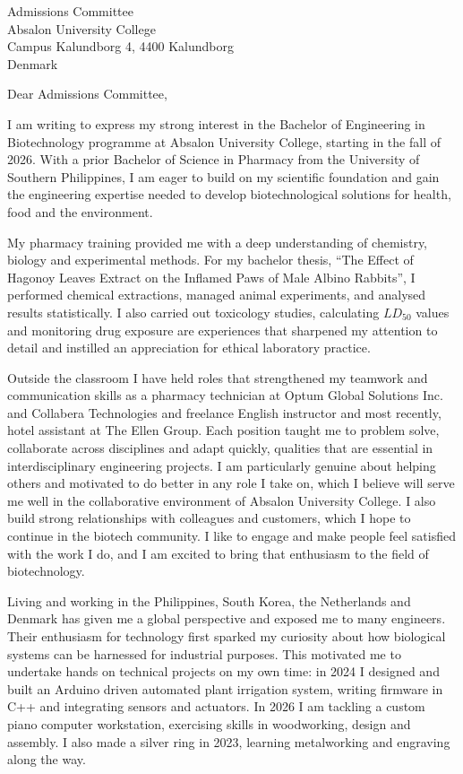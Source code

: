 \documentclass[11pt,a4paper]{letter}
\date{March 7, 2026}
\begin{document}
\begin{letter}{Admissions Committee \\ Absalon University College \\ Campus Kalundborg 4, 4400 Kalundborg\\ Denmark}

\opening{Dear Admissions Committee,}

I am writing to express my strong interest in the Bachelor of Engineering in Biotechnology programme at Absalon University College, starting in the fall of 2026. With a prior Bachelor of Science in Pharmacy from the University of Southern Philippines, I am eager to build on my scientific foundation and gain the engineering expertise needed to develop biotechnological solutions for health, food and the environment.

My pharmacy training provided me with a deep understanding of chemistry, biology and experimental methods. For my bachelor thesis, \enquote{The Effect of Hagonoy Leaves Extract on the Inflamed Paws of Male Albino Rabbits}, I performed chemical extractions, managed animal experiments, and analysed results statistically. I also carried out toxicology studies, calculating $LD_{50}$ values and monitoring drug exposure are experiences that sharpened my attention to detail and instilled an appreciation for ethical laboratory practice.

Outside the classroom I have held roles that strengthened my teamwork and communication skills as a pharmacy technician at Optum Global Solutions Inc. and Collabera Technologies and freelance English instructor and most recently, hotel assistant at The Ellen Group. Each position taught me to problem solve, collaborate across disciplines and adapt quickly, qualities that are essential in interdisciplinary engineering projects. I am particularly genuine about helping others and motivated to do better in any role I take on, which I believe will serve me well in the collaborative environment of Absalon University College. I also build strong relationships with colleagues and customers, which I hope to continue in the biotech community. I like to engage and make people feel satisfied with the work I do, and I am excited to bring that enthusiasm to the field of biotechnology.

Living and working in the Philippines, South Korea, the Netherlands and Denmark has given me a global perspective and exposed me to many engineers. Their enthusiasm for technology first sparked my curiosity about how biological systems can be harnessed for industrial purposes. This motivated me to undertake hands on technical projects on my own time: in 2024 I designed and built an Arduino driven automated plant irrigation system, writing firmware in C++ and integrating sensors and actuators. In 2026 I am tackling a custom piano computer workstation, exercising skills in woodworking, design and assembly. I also made a silver ring in 2023, learning metalworking and engraving along the way.


\end{letter}
\end{document}
